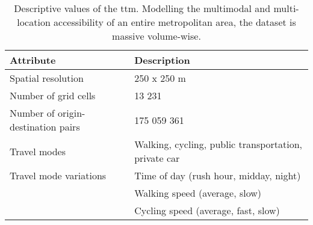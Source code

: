 \begin{table}[H]
	\caption{
		Descriptive values of the \acrshort{ttm}.
		Modelling the multimodal and multi-location accessibility of an entire metropolitan area,
		the dataset is massive volume-wise.
	}
	\label{tab:ttm description}
	\centering
	\begin{tabular}{ | L{0.35\textwidth} | L{0.55\textwidth} | }
		\hline
		\textbf{Attribute}
		& \textbf{Description}
		\\
		\hline
		\hline
		Spatial resolution
		& 250 x 250 m
		\\
		\hline
		Number of grid cells
		& 13 231
		\\
		\hline
		Number of origin-destination pairs
		& 175 059 361
		\\
		\hline
		Travel modes
		& Walking, cycling, public transportation, private car
		\\
		\hline
		Travel mode variations
		& \tabitem Time of day (rush hour, midday, night) \\
		& \tabitem Walking speed (average, slow) \\
		& \tabitem Cycling speed (average, fast, slow) \\
		\hline
	\end{tabular}
\end{table}
